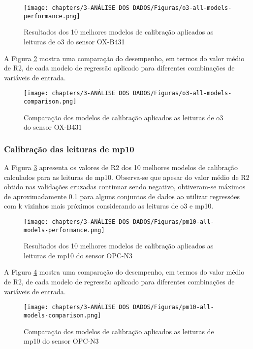 \begin{figure}[h]
    \centering
    \caption{Resultados dos 10 melhores modelos de calibração aplicados as leituras de \acrshort{o3} do sensor OX-B431}
    \texttt{[image: chapters/3-ANÁLISE DOS DADOS/Figuras/o3-all-models-performance.png]}
    \label{fig:data-o3-all-models-performance}
\end{figure}

A Figura \ref{fig:data-o3-all-models-comparison} mostra uma comparação do desempenho, em termos do valor médio de R2, de cada modelo de regressão aplicado para diferentes combinações de variáveis de entrada.

\begin{figure}[h]
    \centering
    \caption{Comparação dos modelos de calibração aplicados as leituras de \acrshort{o3} do sensor OX-B431}
    \texttt{[image: chapters/3-ANÁLISE DOS DADOS/Figuras/o3-all-models-comparison.png]}
    \label{fig:data-o3-all-models-comparison}
\end{figure}

\subsubsection{Calibração das leituras de \acrshort{mp10}}

A Figura \ref{fig:data-pm10-all-models-performance} apresenta os valores de R2 dos 10 melhores modelos de calibração calculados para as leituras de \acrshort{mp10}. Observa-se que apesar do valor médio de R2 obtido nas validações cruzadas continuar sendo negativo, obtiveram-se máximos de aproximadamente 0.1 para alguns conjuntos de dados ao utilizar regressões com k vizinhos mais próximos considerando as leituras de \acrshort{o3} e \acrshort{mp10}.

\begin{figure}[h]
    \centering
    \caption{Resultados dos 10 melhores modelos de calibração aplicados as leituras de \acrshort{mp10} do sensor OPC-N3}
    \texttt{[image: chapters/3-ANÁLISE DOS DADOS/Figuras/pm10-all-models-performance.png]}
    \label{fig:data-pm10-all-models-performance}
\end{figure}

A Figura \ref{fig:data-pm10-all-models-comparison} mostra uma comparação do desempenho, em termos do valor médio de R2, de cada modelo de regressão aplicado para diferentes combinações de variáveis de entrada.

\begin{figure}[h]
    \centering
    \caption{Comparação dos modelos de calibração aplicados as leituras de \acrshort{mp10} do sensor OPC-N3}
    \texttt{[image: chapters/3-ANÁLISE DOS DADOS/Figuras/pm10-all-models-comparison.png]}
    \label{fig:data-pm10-all-models-comparison}
\end{figure}
